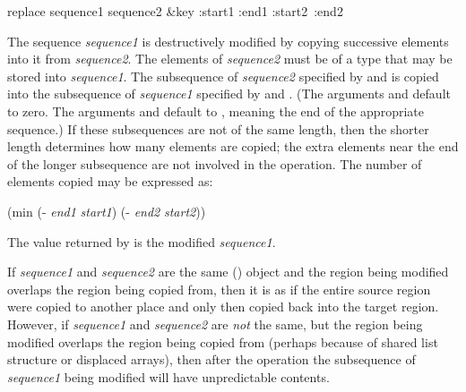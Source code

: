 \begin{defun}[Function]
replace sequence1 sequence2 &key :start1 :end1 :start2~:end2

The sequence \emph{sequence1} is destructively modified by copying successive
elements into it from \emph{sequence2}.  The elements of
\emph{sequence2} must be of a type that may be stored into
\emph{sequence1}.  The subsequence of \emph{sequence2}
specified by  and  is copied into the
subsequence of \emph{sequence1} specified by  and .
(The arguments  and  default to zero.
The arguments  and  default
to {\false}, meaning the end of the appropriate sequence.)
If these subsequences are not of the same length, then
the shorter length determines how many elements are copied; the extra
elements near the end of the longer subsequence are not involved in the
operation.
The number of elements copied may be expressed as:
\begin{lisp}
(min (- \emph{end1} \emph{start1}) (- \emph{end2} \emph{start2}))
\end{lisp}
The value returned by  is the modified \emph{sequence1}.

If \emph{sequence1} and \emph{sequence2} are the same () object
and the region being modified overlaps the region being copied
from, then it is as if the entire source region were copied to another
place and only then copied back into the target region.
However, if \emph{sequence1} and \emph{sequence2} are \emph{not} the same,
but the region being modified overlaps the region being copied from
(perhaps because of shared list structure or displaced arrays),
then after the  operation
the subsequence of \emph{sequence1} being modified will have
unpredictable contents.
\end{defun}

